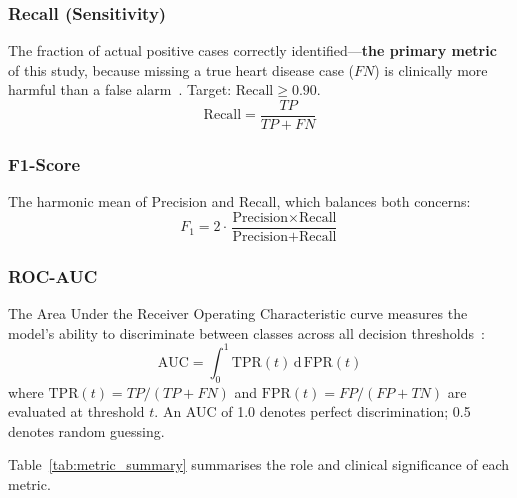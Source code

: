 \documentclass[12pt, a4paper]{article}
\begin{document}
\subsubsection*{Recall (Sensitivity)} \label{sec:recall}
The fraction of actual positive cases correctly identified---\textbf{the
primary metric} of this study, because missing a true heart disease case
($FN$) is clinically more harmful than a false alarm~\cite{rf_heart2021}.
Target: $\text{Recall} \geq 0.90$.
\begin{equation}
  \text{Recall} = \frac{TP}{TP + FN}
  \label{eq:recall}
\end{equation}

\subsubsection*{F1-Score}
The harmonic mean of Precision and Recall, which balances both concerns:
\begin{equation}
  F_1 = 2 \cdot \frac{\text{Precision} \times \text{Recall}}
                      {\text{Precision} + \text{Recall}}
  \label{eq:f1}
\end{equation}

\subsubsection*{ROC-AUC}
The Area Under the Receiver Operating Characteristic curve measures the
model's ability to discriminate between classes across all decision
thresholds~\cite{rf_heart2021}:
\begin{equation}
  \text{AUC} = \int_{0}^{1} \mathrm{TPR}(t)\,\mathrm{d}\,\mathrm{FPR}(t)
  \label{eq:auc}
\end{equation}
where $\mathrm{TPR}(t) = TP/(TP+FN)$ and $\mathrm{FPR}(t) = FP/(FP+TN)$ are
evaluated at threshold $t$. An AUC of 1.0 denotes perfect discrimination;
0.5 denotes random guessing.

\medskip
Table~\ref{tab:metric_summary} summarises the role and clinical significance
of each metric.
\end{document}
